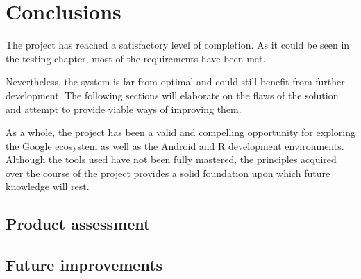 \chapter{Conclusions}
The project has reached a satisfactory level of completion.
As it could be seen in the testing chapter, most of the requirements have been met.

Nevertheless, the system is far from optimal and could still benefit from further development.
The following sections will elaborate on the flaws of the solution and attempt to provide viable ways of improving them.

As a whole, the project has been a valid and compelling opportunity for exploring the Google ecosystem as well as the Android and R development environments. 
Although the tools used have not been fully mastered, the principles acquired over the course of the project provides a solid foundation upon which future knowledge will rest.


\section{Product assessment}

\section{Future improvements}
